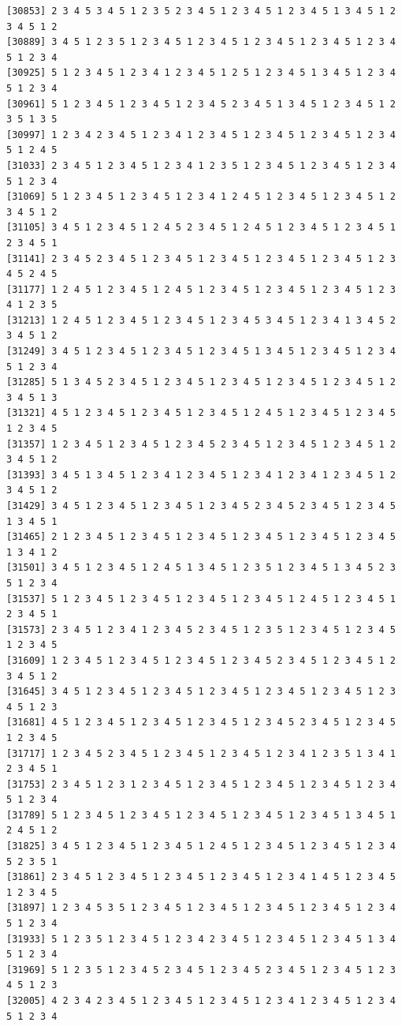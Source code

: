 \documentclass[
  11pt,
]{book}
\begin{document}
\begin{verbatim}
[30853] 2 3 4 5 3 4 5 1 2 3 5 2 3 4 5 1 2 3 4 5 1 2 3 4 5 1 3 4 5 1 2 3 4 5 1 2
[30889] 3 4 5 1 2 3 5 1 2 3 4 5 1 2 3 4 5 1 2 3 4 5 1 2 3 4 5 1 2 3 4 5 1 2 3 4
[30925] 5 1 2 3 4 5 1 2 3 4 1 2 3 4 5 1 2 5 1 2 3 4 5 1 3 4 5 1 2 3 4 5 1 2 3 4
[30961] 5 1 2 3 4 5 1 2 3 4 5 1 2 3 4 5 2 3 4 5 1 3 4 5 1 2 3 4 5 1 2 3 5 1 3 5
[30997] 1 2 3 4 2 3 4 5 1 2 3 4 1 2 3 4 5 1 2 3 4 5 1 2 3 4 5 1 2 3 4 5 1 2 4 5
[31033] 2 3 4 5 1 2 3 4 5 1 2 3 4 1 2 3 5 1 2 3 4 5 1 2 3 4 5 1 2 3 4 5 1 2 3 4
[31069] 5 1 2 3 4 5 1 2 3 4 5 1 2 3 4 1 2 4 5 1 2 3 4 5 1 2 3 4 5 1 2 3 4 5 1 2
[31105] 3 4 5 1 2 3 4 5 1 2 4 5 2 3 4 5 1 2 4 5 1 2 3 4 5 1 2 3 4 5 1 2 3 4 5 1
[31141] 2 3 4 5 2 3 4 5 1 2 3 4 5 1 2 3 4 5 1 2 3 4 5 1 2 3 4 5 1 2 3 4 5 2 4 5
[31177] 1 2 4 5 1 2 3 4 5 1 2 4 5 1 2 3 4 5 1 2 3 4 5 1 2 3 4 5 1 2 3 4 1 2 3 5
[31213] 1 2 4 5 1 2 3 4 5 1 2 3 4 5 1 2 3 4 5 3 4 5 1 2 3 4 1 3 4 5 2 3 4 5 1 2
[31249] 3 4 5 1 2 3 4 5 1 2 3 4 5 1 2 3 4 5 1 3 4 5 1 2 3 4 5 1 2 3 4 5 1 2 3 4
[31285] 5 1 3 4 5 2 3 4 5 1 2 3 4 5 1 2 3 4 5 1 2 3 4 5 1 2 3 4 5 1 2 3 4 5 1 3
[31321] 4 5 1 2 3 4 5 1 2 3 4 5 1 2 3 4 5 1 2 4 5 1 2 3 4 5 1 2 3 4 5 1 2 3 4 5
[31357] 1 2 3 4 5 1 2 3 4 5 1 2 3 4 5 2 3 4 5 1 2 3 4 5 1 2 3 4 5 1 2 3 4 5 1 2
[31393] 3 4 5 1 3 4 5 1 2 3 4 1 2 3 4 5 1 2 3 4 1 2 3 4 1 2 3 4 5 1 2 3 4 5 1 2
[31429] 3 4 5 1 2 3 4 5 1 2 3 4 5 1 2 3 4 5 2 3 4 5 2 3 4 5 1 2 3 4 5 1 3 4 5 1
[31465] 2 1 2 3 4 5 1 2 3 4 5 1 2 3 4 5 1 2 3 4 5 1 2 3 4 5 1 2 3 4 5 1 3 4 1 2
[31501] 3 4 5 1 2 3 4 5 1 2 4 5 1 3 4 5 1 2 3 5 1 2 3 4 5 1 3 4 5 2 3 5 1 2 3 4
[31537] 5 1 2 3 4 5 1 2 3 4 5 1 2 3 4 5 1 2 3 4 5 1 2 4 5 1 2 3 4 5 1 2 3 4 5 1
[31573] 2 3 4 5 1 2 3 4 1 2 3 4 5 2 3 4 5 1 2 3 5 1 2 3 4 5 1 2 3 4 5 1 2 3 4 5
[31609] 1 2 3 4 5 1 2 3 4 5 1 2 3 4 5 1 2 3 4 5 2 3 4 5 1 2 3 4 5 1 2 3 4 5 1 2
[31645] 3 4 5 1 2 3 4 5 1 2 3 4 5 1 2 3 4 5 1 2 3 4 5 1 2 3 4 5 1 2 3 4 5 1 2 3
[31681] 4 5 1 2 3 4 5 1 2 3 4 5 1 2 3 4 5 1 2 3 4 5 2 3 4 5 1 2 3 4 5 1 2 3 4 5
[31717] 1 2 3 4 5 2 3 4 5 1 2 3 4 5 1 2 3 4 5 1 2 3 4 1 2 3 5 1 3 4 1 2 3 4 5 1
[31753] 2 3 4 5 1 2 3 1 2 3 4 5 1 2 3 4 5 1 2 3 4 5 1 2 3 4 5 1 2 3 4 5 1 2 3 4
[31789] 5 1 2 3 4 5 1 2 3 4 5 1 2 3 4 5 1 2 3 4 5 1 2 3 4 5 1 3 4 5 1 2 4 5 1 2
[31825] 3 4 5 1 2 3 4 5 1 2 3 4 5 1 2 4 5 1 2 3 4 5 1 2 3 4 5 1 2 3 4 5 2 3 5 1
[31861] 2 3 4 5 1 2 3 4 5 1 2 3 4 5 1 2 3 4 5 1 2 3 4 1 4 5 1 2 3 4 5 1 2 3 4 5
[31897] 1 2 3 4 5 3 5 1 2 3 4 5 1 2 3 4 5 1 2 3 4 5 1 2 3 4 5 1 2 3 4 5 1 2 3 4
[31933] 5 1 2 3 5 1 2 3 4 5 1 2 3 4 2 3 4 5 1 2 3 4 5 1 2 3 4 5 1 3 4 5 1 2 3 4
[31969] 5 1 2 3 5 1 2 3 4 5 2 3 4 5 1 2 3 4 5 2 3 4 5 1 2 3 4 5 1 2 3 4 5 1 2 3
[32005] 4 2 3 4 2 3 4 5 1 2 3 4 5 1 2 3 4 5 1 2 3 4 1 2 3 4 5 1 2 3 4 5 1 2 3 4

\end{verbatim}
\end{document}
